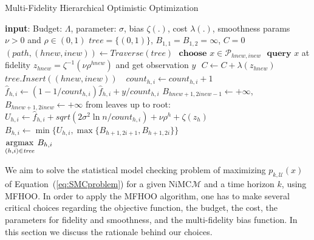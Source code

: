 \documentclass[11pt]{article}
\theoremstyle{definition}
\newcommand{\sayan}[1]{\textcolor{blue}{#1}}
\newcommand{\M}{\mathcal{M}}
\newcommand{\phit}[3]{{p_{#1,#2}{(#3)}}}
\newcommand{\observ}{y}
\newcommand{\Unsafe}{\mathcal{U}}
\newcommand{\modelname}{NiMC\xspace}
\newcommand{\partition}[2]{{\mathcal{P}_{#1,#2}}}
\newcommand{\counter}[2]{{\mathit{count}_{#1,#2}}}
\begin{document}
\begin{algorithm}[ht!]
\caption{Multi-Fidelity Hierarchical Optimistic Optimization~\cite{sen2019noisy}}
\label{Al:MFHOO}
\begin{algorithmic}[1]
\State \textbf{input}: Budget: $\Lambda$, parameter: $\sigma$, bias $\zeta(.)$, cost $\lambda(.)$, smoothness params $\nu>0$ and $\rho\in(0,1)$
\State $\mathit{tree} =\{(0,1)\}$, $B_{1,1}=B_{1,2}=\infty$, $C=0$
	 $\label{ln:mf_outerwhile}$
        \State $(\mathit{path}, (\mathit{hnew},\mathit{inew})) \gets \mathit{Traverse}(\mathit{tree})$ $\label{ln:mf_path}$
        \State $\textbf{choose}$
        $x\in\partition{\mathit{hnew}}{\mathit{inew}}$ $\label{ln:mf_choose}$
        \State $\textbf{query}$ $x$ at fidelity $z_{hnew} = \zeta^{-1}(\nu\rho^{hnew})$ and get observation $\observ$ $\label{ln:mf_recieve}$
        \State $C \leftarrow C + \lambda(z_{hnew})$ $\label{ln:mf_cost}$
    	\State $\mathit{tree.Insert}((\mathit{hnew},\mathit{inew}))$ $\label{ln:mf_insert}$
    	 $\label{ln:mf_update-path}$
        	\State $\counter{h}{i} \leftarrow \counter{h}{i} + 1$
            \State $\hat{f}_{h,i} \leftarrow (1- 1/\counter{h}{i})\hat{f}_{h,i} + \observ/\counter{h}{i}$
    	\EndFor
    	\State  $B_{\mathit{hnew}+1,2\mathit{inew}-1} \leftarrow +\infty$, $B_{\mathit{hnew}+1,2\mathit{inew}} \leftarrow +\infty$
    	  from  leaves up to  root:  $\label{ln:mf_update-tree}$
        	\State $U_{h,i} \leftarrow \hat{f}_{h,i} +\mathit{sqrt}(2\sigma^2\ln n/\counter{h}{i})+\nu\rho^h + \zeta(z_{h})$
            \State $B_{h,i} \leftarrow \min\{U_{h,i}, \max\{B_{h+1,2i+1}, B_{h+1,2i}\}\}$
    	\EndFor
	\EndWhile\\

	\Return $\underset{(h,i)\in \mathit{tree}}{\rm argmax}\ B_{h,i}$
	\end{algorithmic}
\end{algorithm}

\label{sec:smc-mfhoo}
We aim to solve the statistical model checking problem of  maximizing $\phit{k}{\Unsafe}{x}$ of Equation~(\ref{eq:SMCproblem}) for a given \modelname $\M$ and a time horizon $k$,  using  MFHOO.
%
In order to apply the MFHOO algorithm, one has to make several critical choices regarding the objective function, the budget, the cost, the parameters for fidelity and smoothness, and the multi-fidelity bias function. In this section we discuss the rationale behind our choices.
\end{document}
